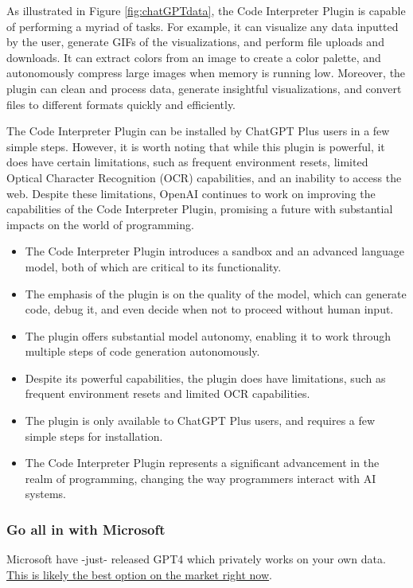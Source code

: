 As illustrated in Figure \ref{fig:chatGPTdata}, the Code Interpreter Plugin is capable of performing a myriad of tasks. For example, it can visualize any data inputted by the user, generate GIFs of the visualizations, and perform file uploads and downloads. It can extract colors from an image to create a color palette, and autonomously compress large images when memory is running low. Moreover, the plugin can clean and process data, generate insightful visualizations, and convert files to different formats quickly and efficiently.

The Code Interpreter Plugin can be installed by ChatGPT Plus users in a few simple steps. However, it is worth noting that while this plugin is powerful, it does have certain limitations, such as frequent environment resets, limited Optical Character Recognition (OCR) capabilities, and an inability to access the web. Despite these limitations, OpenAI continues to work on improving the capabilities of the Code Interpreter Plugin, promising a future with substantial impacts on the world of programming.

\begin{itemize}
\item The Code Interpreter Plugin introduces a sandbox and an advanced language model, both of which are critical to its functionality.
\item The emphasis of the plugin is on the quality of the model, which can generate code, debug it, and even decide when not to proceed without human input.
\item The plugin offers substantial model autonomy, enabling it to work through multiple steps of code generation autonomously.
\item Despite its powerful capabilities, the plugin does have limitations, such as frequent environment resets and limited OCR capabilities.
\item The plugin is only available to ChatGPT Plus users, and requires a few simple steps for installation.
\item The Code Interpreter Plugin represents a significant advancement in the realm of programming, changing the way programmers interact with AI systems.
\end{itemize}
\subsubsection{Go all in with Microsoft}
\label{sec:microsoft}
Microsoft have -just- released GPT4 which privately works on your own data. \href{https://techcommunity.microsoft.com/t5/ai-cognitive-services-blog/introducing-azure-openai-service-on-your-data-in-public-preview/ba-p/3847000}{This is likely the best option on the market right now}.
